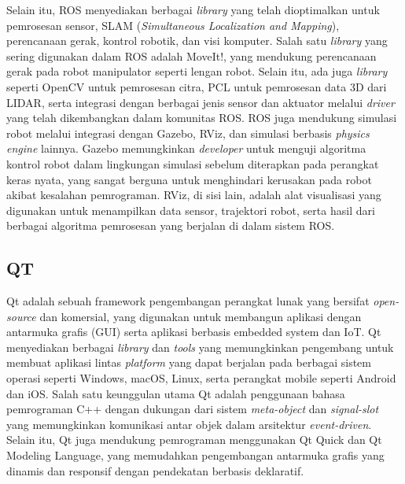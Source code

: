 Selain itu, ROS menyediakan berbagai \emph{library} yang telah dioptimalkan untuk pemrosesan sensor,
SLAM (\emph{Simultaneous Localization and Mapping}), perencanaan gerak, kontrol robotik, dan visi komputer.
Salah satu \emph{library} yang sering digunakan dalam ROS adalah MoveIt!, yang mendukung perencanaan gerak
pada robot manipulator seperti lengan robot. Selain itu, ada juga \emph{library} seperti OpenCV untuk
pemrosesan citra, PCL untuk pemrosesan data 3D dari LIDAR, serta integrasi dengan
berbagai jenis sensor dan aktuator melalui \emph{driver} yang telah dikembangkan dalam komunitas ROS.
ROS juga mendukung simulasi robot melalui integrasi dengan Gazebo, RViz, dan simulasi berbasis \emph{physics engine} lainnya.
Gazebo memungkinkan \emph{developer} untuk menguji algoritma kontrol robot dalam lingkungan simulasi sebelum diterapkan pada
perangkat keras nyata, yang sangat berguna untuk menghindari kerusakan pada robot akibat kesalahan pemrograman. RViz,
di sisi lain, adalah alat visualisasi yang digunakan untuk menampilkan data sensor, trajektori robot, serta hasil dari
berbagai algoritma pemrosesan yang berjalan di dalam sistem ROS.

\subsection{QT}

Qt adalah sebuah framework pengembangan perangkat lunak yang bersifat \emph{open-source} dan komersial,
yang digunakan untuk membangun aplikasi dengan antarmuka grafis (GUI) serta aplikasi berbasis
embedded system dan IoT. Qt menyediakan berbagai \emph{library} dan \emph{tools}
yang memungkinkan pengembang untuk membuat aplikasi lintas \emph{platform} yang dapat berjalan pada berbagai
sistem operasi seperti Windows, macOS, Linux, serta perangkat mobile seperti Android dan iOS.
Salah satu keunggulan utama Qt adalah penggunaan bahasa pemrograman C++ dengan dukungan dari sistem
\emph{meta-object} dan \emph{signal-slot} yang memungkinkan komunikasi antar objek dalam arsitektur \emph{event-driven}.
Selain itu, Qt juga mendukung pemrograman menggunakan Qt Quick dan Qt Modeling Language,
yang memudahkan pengembangan antarmuka grafis yang dinamis dan responsif dengan pendekatan berbasis deklaratif. 

